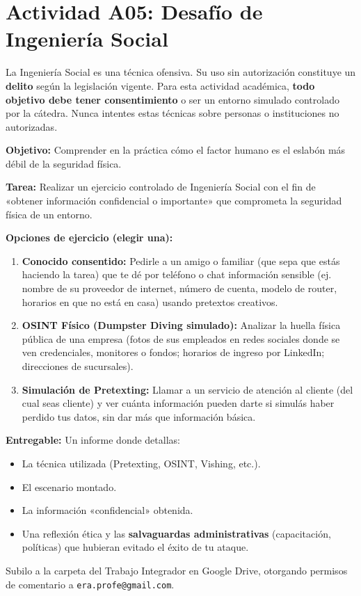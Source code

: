 \documentclass[11pt,a4paper]{article}
\begin{document}
\section{Actividad A05: Desafío de Ingeniería Social}

\begin{alerta}
La Ingeniería Social es una técnica ofensiva. Su uso sin autorización constituye un \textbf{delito} según la legislación vigente. Para esta actividad académica, \textbf{todo objetivo debe tener consentimiento} o ser un entorno simulado controlado por la cátedra. Nunca intentes estas técnicas sobre personas o instituciones no autorizadas.
\end{alerta}

\begin{clave}
\textbf{Objetivo:} Comprender en la práctica cómo el factor humano es el eslabón más débil de la seguridad física.

\textbf{Tarea:} Realizar un ejercicio controlado de Ingeniería Social con el fin de «obtener información confidencial o importante» que comprometa la seguridad física de un entorno. 

\textbf{Opciones de ejercicio (elegir una):}
\begin{enumerate}
  \item \textbf{Conocido consentido:} Pedirle a un amigo o familiar (que sepa que estás haciendo la tarea) que te dé por teléfono o chat información sensible (ej. nombre de su proveedor de internet, número de cuenta, modelo de router, horarios en que no está en casa) usando pretextos creativos.
  \item \textbf{OSINT Físico (Dumpster Diving simulado):} Analizar la huella física pública de una empresa (fotos de sus empleados en redes sociales donde se ven credenciales, monitores o fondos; horarios de ingreso por LinkedIn; direcciones de sucursales).
  \item \textbf{Simulación de Pretexting:} Llamar a un servicio de atención al cliente (del cual seas cliente) y ver cuánta información pueden darte si simulás haber perdido tus datos, sin dar más que información básica.
\end{enumerate}

\textbf{Entregable:} Un informe donde detallas:
\begin{itemize}
  \item La técnica utilizada (Pretexting, OSINT, Vishing, etc.).
  \item El escenario montado.
  \item La información «confidencial» obtenida.
  \item Una reflexión ética y las \textbf{salvaguardas administrativas} (capacitación, políticas) que hubieran evitado el éxito de tu ataque.
\end{itemize}

Subilo a la carpeta del Trabajo Integrador en Google Drive, otorgando permisos de comentario a \texttt{era.profe@gmail.com}.
\end{clave}
\end{document}
